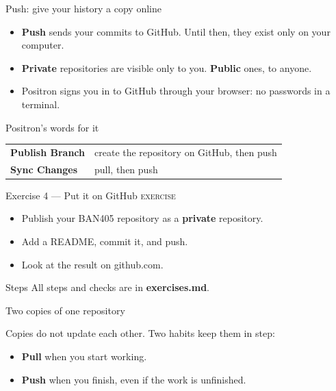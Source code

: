 \documentclass[aspectratio=169,11pt]{beamer}
\newcommand{\key}[1]{\textbf{\textcolor{ban}{#1}}}
\newcommand{\ui}[1]{\textbf{#1}}
\newcommand{\exerciseframe}[3]{%
  \begin{frame}[t]{#1}
    \vspace{0.4em}
    {\small\textcolor{softgray}{\textsc{exercise}}}\par\vspace{0.6em}
    #2
    \vfill
    \begin{block}{Steps}
      All steps and checks are in \key{exercises.md}. #3
    \end{block}
    \vspace{0.6em}
  \end{frame}}
\begin{document}
\begin{frame}{Push: give your history a copy online}
  \begin{itemize}
    \item \key{Push} sends your commits to GitHub. Until then, they exist only on your computer.
    \item \key{Private} repositories are visible only to you. \key{Public} ones, to anyone.
    \item Positron signs you in to GitHub through your browser: no passwords in a terminal.
  \end{itemize}
  \vspace{0.6em}
  \begin{block}{Positron's words for it}
    \begin{tabular}{@{}l l@{}}
      \ui{Publish Branch} & create the repository on GitHub, then push \\
      \ui{Sync Changes}   & pull, then push \\
    \end{tabular}
  \end{block}
\end{frame}

\exerciseframe{Exercise 4 --- Put it on GitHub}{%
  \begin{itemize}
    \item Publish your BAN405 repository as a \textbf{private} repository.
    \item Add a README, commit it, and push.
    \item Look at the result on github.com.
  \end{itemize}}{}

\begin{frame}{Two copies of one repository}
  \centering

  \vspace{1em}
  \raggedright
  Copies do not update each other. Two habits keep them in step:
  \begin{itemize}
    \item \key{Pull} when you start working.
    \item \key{Push} when you finish, even if the work is unfinished.
  \end{itemize}
\end{frame}
\end{document}
